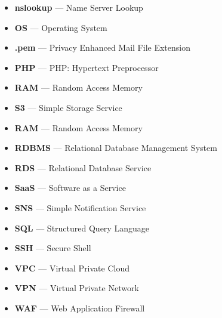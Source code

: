 \begin{itemize}
    \item  \textbf{nslookup} — Name Server Lookup
    \item  \textbf{OS} — Operating System
    \item  \textbf{.pem} — Privacy Enhanced Mail File Extension
    \item  \textbf{PHP} — PHP: Hypertext Preprocessor
    \item  \textbf{RAM} — Random Access Memory
    \item  \textbf{S3} — Simple Storage Service
    \item  \textbf{RAM} — Random Access Memory
    \item  \textbf{RDBMS} — Relational Database Management System
    \item  \textbf{RDS} — Relational Database Service
    \item  \textbf{SaaS} — Software as a Service
    \item  \textbf{SNS} — Simple Notification Service
    \item  \textbf{SQL} — Structured Query Language
    \item  \textbf{SSH} — Secure Shell
    \item  \textbf{VPC} — Virtual Private Cloud
    \item  \textbf{VPN} — Virtual Private Network
    \item  \textbf{WAF} — Web Application Firewall
\end{itemize}